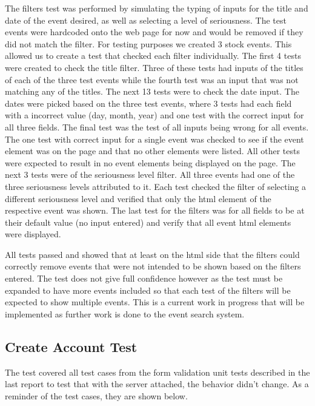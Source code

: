 \documentclass[a4paper]{article}
\begin{document}
The filters test was performed by simulating the typing of inputs for the title and date of the event desired, as well as selecting a level of seriousness.
The test events were hardcoded onto the web page for now and would be removed if they did not match the filter.
For testing purposes we created 3 stock events.
This allowed us to create a test that checked each filter individually.
The first 4 tests were created to check the title filter.
Three of these tests had inputs of the titles of each of the three test events while the fourth test was an input that was not matching any of the titles.
The next 13 tests were to check the date input.
The dates were picked based on the three test events, where 3 tests had each field with a incorrect value (day, month, year) and one test with the correct input for all three fields.
The final test was the test of all inputs being wrong for all events. The one test with correct input for a single event was checked to see if the event element was on the page and that no other elements were listed.
All other tests were expected to result in no event elements being displayed on the page.
The next 3 tests were of the seriousness level filter. 
All three events had one of the three seriousness levels attributed to it.
Each test checked the filter of selecting a different seriousness level and verified that only the html element of the respective event was shown.
The last test for the filters was for all fields to be at their default value (no input entered) and verify that all event html elements were displayed.

All tests passed and showed that at least on the html side that the filters could correctly remove events that were not intended to be shown based on the filters entered.
The test does not give full confidence however as the test must be expanded to have more events included so that each test of the filters will be expected to show multiple events.
This is a current work in progress that will be implemented as further work is done to the event search system.

\subsection{Create Account Test}

The test covered all test cases from the form validation unit tests described in the last report to test that with the server attached, the behavior didn't change.
As a reminder of the test cases, they are shown below.
\end{document}
